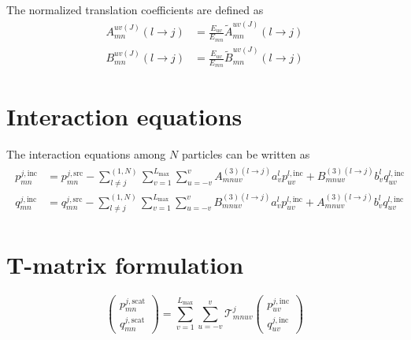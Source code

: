 \documentclass[11pt]{article}
\begin{document}
The normalized translation coefficients are defined as
\begin{subequations}
\begin{align}
    A_{mn}^{uv(J)}(l \rightarrow j) &= \frac{E_{uv}}{E_{mn}} \widetilde{A}_{mn}^{uv(J)}(l \rightarrow j) \\
    B_{mn}^{uv(J)}(l \rightarrow j) &= \frac{E_{uv}}{E_{mn}} \widetilde{B}_{mn}^{uv(J)}(l \rightarrow j)
\end{align}
\end{subequations}


\section{Interaction equations}
The interaction equations among $N$ particles can be written as
\begin{align}
    \begin{split}
        p_{mn}^{j,\text{inc}} &= p_{mn}^{j,\text{src}}  -  \sum_{l \neq j}^{(1,N)}\sum_{v=1}^{L_\text{max}} \sum_{u=-v}^{v}
        A_{mnuv}^{(3)(l \rightarrow j)} a_v^l p_{uv}^{l,\text{inc}}
        +B_{mnuv}^{(3)(l \rightarrow j)} b_v^l q_{uv}^{l,\text{inc}} \\
        q_{mn}^{j,\text{inc}} &= q_{mn}^{j,\text{src}}  -  \sum_{l \neq j}^{(1,N)}\sum_{v=1}^{L_\text{max}} \sum_{u=-v}^{v}
        B_{mnuv}^{(3)(l \rightarrow j)} a_v^l p_{uv}^{l,\text{inc}}
        +A_{mnuv}^{(3)(l \rightarrow j)} b_v^l q_{uv}^{l,\text{inc}}
    \label{eqn:gmt_system}
    \end{split}
\end{align}

\section{T-matrix formulation}
\begin{equation}
    \begin{pmatrix}
        p_{mn}^{j,\text{scat}} \\[6pt]
        q_{mn}^{j,\text{scat}}
    \end{pmatrix}
    = \sum_{v=1}^{L_\text{max}} \sum_{u=-v}^{v}
    \mathcal{T}_{mnuv}^j
    \begin{pmatrix}
        p_{uv}^{j,\text{inc}} \\[6pt]
        q_{uv}^{j,\text{inc}}
    \end{pmatrix}
    \label{eqn:t_matrix}
\end{equation}
\end{document}
